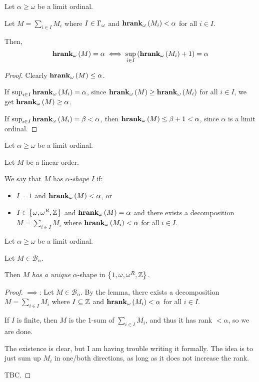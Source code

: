\begin{lemma}
  Let $\alpha \ge \omega$ be a limit ordinal.

  Let $M = \sum_{i \in I} M_i$ where $I \in \Gamma_{\omega}$ and $\mathbf{hrank}_{\omega}\left( M_i \right) < \alpha$
  for all $i \in I$.

  Then,
  $$\mathbf{hrank}_{\omega}\left( M \right) = \alpha \iff \sup_{i \in I} \left( {\mathbf{hrank}_{\omega}\left( M_i \right)+1} \right) = \alpha$$
\end{lemma}

\begin{proof}
  Clearly $\mathbf{hrank}_{\omega}\left( M \right) \le \alpha$.
  
  If $\sup_{i \in I}{\mathbf{hrank}_{\omega}\left( M_i \right)} = \alpha$,
  since $\mathbf{hrank}_{\omega}\left( M \right) \ge \mathbf{hrank}_{\omega}\left( M_i \right)$ for all $i \in I$,
  we get $\mathbf{hrank}_{\omega}\left( M \right) \ge \alpha$.

  If $\sup_{i \in I}{\mathbf{hrank}_{\omega}\left( M_i \right)} = \beta < \alpha$,
  then $\mathbf{hrank}_{\omega}\left( M \right) \le \beta + 1 < \alpha$, since 
  $\alpha$ is a limit ordinal.
\end{proof}

\begin{definition}
  Let $\alpha \ge \omega$ be a limit ordinal.

  Let $M$ be a linear order.

  We say that $M$ has \emph{$\alpha$-shape} $I$ if:

  \begin{itemize}
    \item $I = 1$ and $\mathbf{hrank}_{\omega}\left( M \right) < \alpha$, or
    \item $I \in \left\{ {\omega, \omega^R, \mathbb{Z}} \right\}$ and $\mathbf{hrank}_{\omega}\left( M \right) = \alpha$ and
      there exists a decomposition $M = \sum_{i \in I} M_i$ where
      $\mathbf{hrank}_{\omega}\left( M_i \right) < \alpha$ for all $i \in I$.
  \end{itemize}
\end{definition}


\begin{lemma}
  Let $\alpha \ge \omega$ be a limit ordinal.

  Let $M \in \mathcal{B}_{\alpha}$.
  
  Then $M$ \emph{has a unique} $\alpha$-shape in $\left\{ {1, \omega, \omega^R, \mathbb{Z}} \right\}$.
\end{lemma}

\begin{proof}
  $\implies$: Let $M \in \mathcal{B}_{\alpha}$. By the lemma,
  there exists a decomposition $M = \sum_{i \in I} M_i$ where
  $I \subseteq \mathbb{Z}$ and $\mathbf{hrank}_{\omega}\left( M_i \right) < \alpha$ for all $i \in I$.

  If $I$ is finite, then $M$ is the $1$-sum of $\sum_{i \in I} M_i$,
  and thus it has rank $< \alpha$, so we are done.

  The existence is clear, but I am having trouble writing
  it formally. The idea is to just sum up $M_i$ in one/both directions,
  as long as it does not increase the rank.

  TBC.


\end{proof}